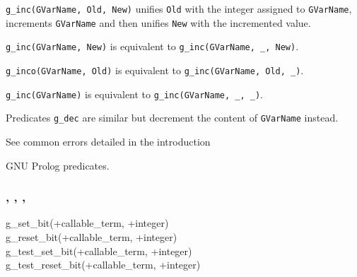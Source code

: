 \Description

\texttt{g\_inc(GVarName, Old, New)} unifies \texttt{Old} with the
integer assigned to \texttt{GVarName}, increments \texttt{GVarName} and
then unifies \texttt{New} with the incremented value.

\texttt{g\_inc(GVarName, New)} is equivalent to
\texttt{g\_inc(GVarName, \_, New)}.

\texttt{g\_inco(GVarName, Old)} is equivalent to
\texttt{g\_inc(GVarName, Old, \_)}.

\texttt{g\_inc(GVarName)} is equivalent to \texttt{g\_inc(GVarName, \_, \_)}.

Predicates \texttt{g\_dec} are similar but decrement the content of
\texttt{GVarName} instead.

\Errors

See common errors detailed in the introduction 

\begin{PlErrorsNoTitle}





\end{PlErrorsNoTitle}

\Portability

GNU Prolog predicates.

\subsubsection{,
               ,
               ,
               }

\begin{TemplatesOneCol}
g\_set\_bit(+callable\_term, +integer) \\
g\_reset\_bit(+callable\_term, +integer) \\
g\_test\_set\_bit(+callable\_term, +integer) \\
g\_test\_reset\_bit(+callable\_term, +integer)

\end{TemplatesOneCol}

